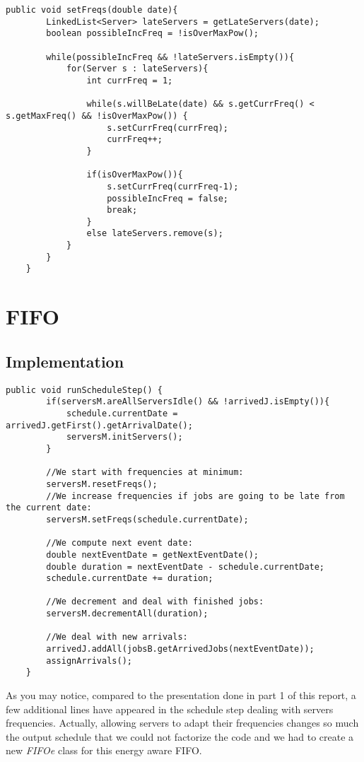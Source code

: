 \documentclass[./report.tex]{subfiles}
\begin{document}
\begin{lstlisting}[style=Java, caption={Source code of the \textit{setFreqs()} method}]
	public void setFreqs(double date){
		LinkedList<Server> lateServers = getLateServers(date);
		boolean possibleIncFreq = !isOverMaxPow();
		
		while(possibleIncFreq && !lateServers.isEmpty()){
			for(Server s : lateServers){
				int currFreq = 1;
				
				while(s.willBeLate(date) && s.getCurrFreq() < s.getMaxFreq() && !isOverMaxPow()) {
					s.setCurrFreq(currFreq);
					currFreq++;
				}
				
				if(isOverMaxPow()){
					s.setCurrFreq(currFreq-1);
					possibleIncFreq = false;
					break;
				}
				else lateServers.remove(s);
			}
		}
	}
\end{lstlisting}


\newpage
\section{FIFO}
\subsection{Implementation}
\label{subsec:fifoe}

\begin{lstlisting}[style=Java, caption={Source code of an energy aware FIFO adapted for multiple servers}]
	public void runScheduleStep() {
		if(serversM.areAllServersIdle() && !arrivedJ.isEmpty()){
			schedule.currentDate = arrivedJ.getFirst().getArrivalDate();
			serversM.initServers();
		}
		
		//We start with frequencies at minimum:
		serversM.resetFreqs();
		//We increase frequencies if jobs are going to be late from the current date:
		serversM.setFreqs(schedule.currentDate);
		
		//We compute next event date:
		double nextEventDate = getNextEventDate();
		double duration = nextEventDate - schedule.currentDate;
		schedule.currentDate += duration;
		
		//We decrement and deal with finished jobs:
		serversM.decrementAll(duration);
		
		//We deal with new arrivals:
		arrivedJ.addAll(jobsB.getArrivedJobs(nextEventDate));
		assignArrivals();
	}
\end{lstlisting}

As you may notice, compared to the presentation done in part 1 of this report, a few additional lines have appeared in the schedule step dealing with servers frequencies. Actually, allowing servers to adapt their frequencies changes so much the output schedule that we could not factorize the code and we had to create a new \textit{FIFOe} class for this energy aware FIFO.
\end{document}
